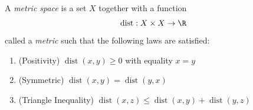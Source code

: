 

\begin{definition}
  \label{def:metricspaces}
  A \emph{metric space} is a set $X$ together with a function 
  $$ \operatorname{dist}: X \times X \to \R $$ 
  called a \emph{metric} such that the following laws are satisfied: 

  \begin{enumerate}
    \item (Positivity) $\operatorname{dist}(x,y) \ge 0$ with equality $x = y$
    \item (Symmetric) $\operatorname{dist}(x,y) = \operatorname{dist}(y,x)$
    \item (Triangle Inequality) $\operatorname{dist}(x,z) \le \operatorname{dist}(x,y) + \operatorname{dist}(y,z)$ 
  \end{enumerate}
\end{definition}
